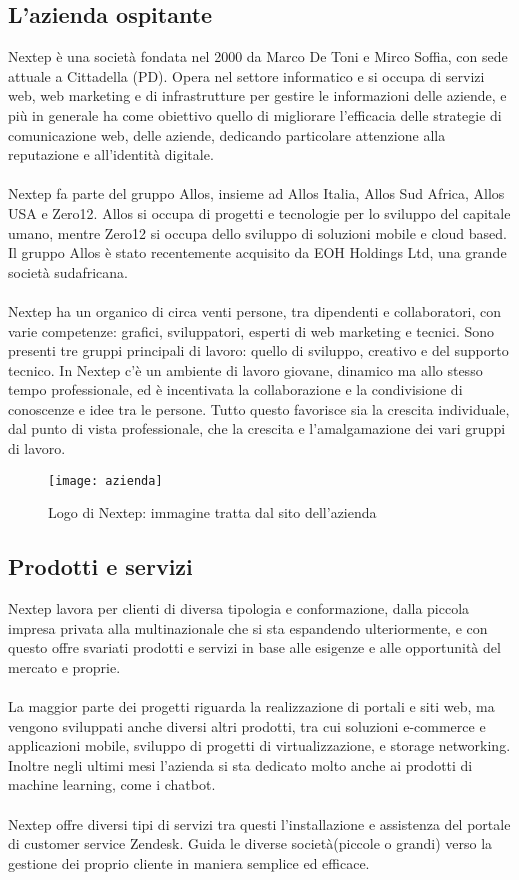 \subsection{L'azienda ospitante}
Nextep è una società fondata nel 2000 da Marco De Toni e Mirco Soffia, con sede
attuale a Cittadella (PD).
Opera nel settore informatico e si occupa di servizi web, web marketing e di infrastrutture
per gestire le informazioni delle aziende, e più in generale ha come obiettivo
quello di migliorare l’efficacia delle strategie di comunicazione web, delle aziende,
dedicando particolare attenzione alla reputazione e all’identità digitale. \\ \\
Nextep fa parte del gruppo Allos, insieme ad Allos Italia, Allos Sud Africa, Allos
USA e Zero12.
Allos si occupa di progetti e tecnologie per lo sviluppo del capitale umano, mentre
Zero12 si occupa dello sviluppo di soluzioni mobile e cloud based.
Il gruppo Allos è stato recentemente acquisito da EOH Holdings Ltd, una grande
società sudafricana.\\ \\
Nextep ha un organico di circa venti persone, tra dipendenti e collaboratori, con
varie competenze: grafici, sviluppatori, esperti di web marketing e tecnici. Sono presenti
tre gruppi principali di lavoro: quello di sviluppo, creativo e del supporto
tecnico.
In Nextep c’è un ambiente di lavoro giovane, dinamico ma allo stesso tempo professionale,
ed è incentivata la collaborazione e la condivisione di conoscenze e idee
tra le persone. Tutto questo favorisce sia la crescita individuale, dal punto di vista
professionale, che la crescita e l’amalgamazione dei vari gruppi di lavoro.
\begin{figure}[!h] 
	\centering 
	\texttt{[image: azienda]} 
	\caption{Logo di Nextep: immagine tratta dal sito dell’azienda}
\end{figure}
\subsection{Prodotti e servizi}
Nextep lavora per clienti di diversa tipologia e conformazione, dalla piccola impresa
privata alla multinazionale che si sta espandendo ulteriormente, e con questo offre
svariati prodotti e servizi in base alle esigenze e alle opportunità del mercato e proprie. 
\\ \\La maggior parte dei progetti riguarda la realizzazione di portali e siti web, ma vengono
sviluppati anche diversi altri prodotti, tra cui soluzioni e-commerce e applicazioni
mobile, sviluppo di progetti di virtualizzazione, e storage networking. Inoltre negli ultimi mesi l'azienda si sta dedicato molto anche ai prodotti di machine learning, come i chatbot. \\ \\Nextep offre diversi tipi di servizi tra questi l'installazione e assistenza del portale di customer service Zendesk. Guida le diverse società(piccole o grandi) verso la gestione dei proprio cliente in maniera semplice ed efficace. 

